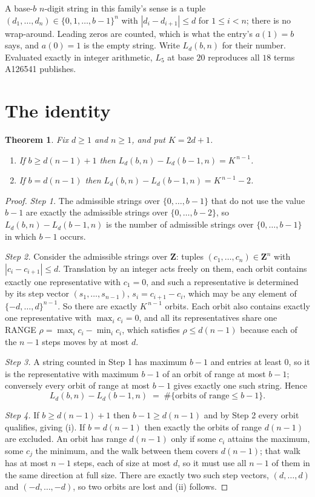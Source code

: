 \documentclass[11pt,a4paper]{article}
\theoremstyle{plain}
\newtheorem{theorem}{Theorem}
\theoremstyle{definition}
\begin{document}
A base-$b$ $n$-digit string in this family's sense is a tuple
$(d_1,\dots,d_n)\in\{0,1,\dots,b-1\}^{n}$ with $|d_i-d_{i+1}|\le d$ for $1\le i<n$; there
is no wrap-around. Leading zeros are counted, which is what the entry's $a(1)=b$ says, and
$a(0)=1$ is the empty string. Write $L_d(b,n)$ for their number. Evaluated exactly in integer
arithmetic, $L_{5}$ at base $20$ reproduces all $18$ terms A126541 publishes.

\section{The identity}

\begin{theorem}
Fix $d\ge1$ and $n\ge1$, and put $K=2d+1$.
\begin{enumerate}
\item[(i)] If $b\ge d(n-1)+1$ then $L_d(b,n)-L_d(b-1,n)=K^{\,n-1}$.
\item[(ii)] If $b=d(n-1)$ then $L_d(b,n)-L_d(b-1,n)=K^{\,n-1}-2$.
\end{enumerate}
\end{theorem}

\begin{proof}
\emph{Step 1.} The admissible strings over $\{0,\dots,b-1\}$ that do not use the value $b-1$
are exactly the admissible strings over $\{0,\dots,b-2\}$, so $L_d(b,n)-L_d(b-1,n)$ is the
number of admissible strings over $\{0,\dots,b-1\}$ in which $b-1$ occurs.

\emph{Step 2.} Consider the admissible strings over $\mathbf{Z}$: tuples
$(c_1,\dots,c_n)\in\mathbf{Z}^{n}$ with $|c_i-c_{i+1}|\le d$. Translation by an integer acts
freely on them, each orbit contains exactly one representative with $c_1=0$, and such a
representative is determined by its step vector $(s_1,\dots,s_{n-1})$, $s_i=c_{i+1}-c_i$,
which may be any element of $\{-d,\dots,d\}^{n-1}$. So there are exactly $K^{\,n-1}$ orbits.
Each orbit also contains exactly one representative with $\max_i c_i=0$, and all its
representatives share one RANGE $\rho=\max_ic_i-\min_ic_i$, which satisfies
$\rho\le d(n-1)$ because each of the $n-1$ steps moves by at most $d$.

\emph{Step 3.} A string counted in Step 1 has maximum $b-1$ and entries at least $0$, so it is
the representative with maximum $b-1$ of an orbit of range at most $b-1$; conversely every orbit
of range at most $b-1$ gives exactly one such string. Hence
\[
L_d(b,n)-L_d(b-1,n)\;=\;\#\{\text{orbits of range}\le b-1\} .
\]

\emph{Step 4.} If $b\ge d(n-1)+1$ then $b-1\ge d(n-1)$ and by Step 2 every orbit qualifies,
giving (i). If $b=d(n-1)$ then exactly the orbits of range $d(n-1)$ are excluded. An orbit has
range $d(n-1)$ only if some $c_i$ attains the maximum, some $c_j$ the minimum, and the walk
between them covers $d(n-1)$; that walk has at most $n-1$ steps, each of size at most $d$, so it
must use all $n-1$ of them in the same direction at full size. There are exactly two such step
vectors, $(d,\dots,d)$ and $(-d,\dots,-d)$, so two orbits are lost and (ii) follows.
\end{proof}
\end{document}

